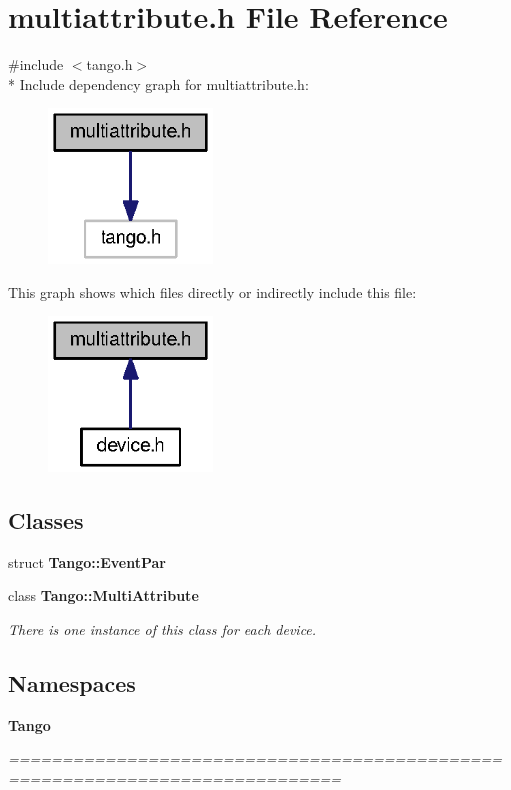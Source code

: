 \section{multiattribute.\-h File Reference}
\label{multiattribute_8h}
{\ttfamily \#include $<$tango.\-h$>$}\\*
Include dependency graph for multiattribute.\-h\-:
\nopagebreak
\begin{figure}[H]
\begin{center}
\leavevmode
\includegraphics[width=124pt]{d8/d43/multiattribute_8h__incl}
\end{center}
\end{figure}
This graph shows which files directly or indirectly include this file\-:
\nopagebreak
\begin{figure}[H]
\begin{center}
\leavevmode
\includegraphics[width=124pt]{d3/d72/multiattribute_8h__dep__incl}
\end{center}
\end{figure}
\subsection*{Classes}
\begin{DoxyCompactItemize}
\item 
struct {\bf Tango\-::\-Event\-Par}
\item 
class {\bf Tango\-::\-Multi\-Attribute}
\begin{DoxyCompactList}\small\item\em There is one instance of this class for each device. \end{DoxyCompactList}\end{DoxyCompactItemize}
\subsection*{Namespaces}
\begin{DoxyCompactItemize}
\item 
{\bf Tango}
\begin{DoxyCompactList}\small\item\em ============================================================================= \end{DoxyCompactList}\end{DoxyCompactItemize}
